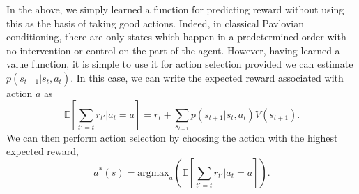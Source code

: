 In the above, we simply learned a function for predicting reward without using this as the basis of taking good actions.
Indeed, in classical Pavlovian conditioning, there are only states which happen in a predetermined order with no intervention or control on the part of the agent.
However, having learned a value function, it is simple to use it for action selection provided we can estimate $p(s_{t+1} | s_t, a_t)$.
In this case, we can write the expected reward associated with action $a$ as
\begin{equation}
    \mathbb{E} \left [\sum_{t' = t} r_{t'} | a_t = a \right ] = r_t + \sum_{s_{t+1}} p(s_{t+1} | s_t, a_t) V(s_{t+1}).
\end{equation}
We can then perform action selection by choosing the action with the highest expected reward,
\begin{equation}
    \label{eq:value_action_selection}
    a^*(s) = \text{argmax}_{a} \left ( \mathbb{E} \left [\sum_{t' = t} r_{t'} | a_t = a \right ] \right ).
\end{equation}

